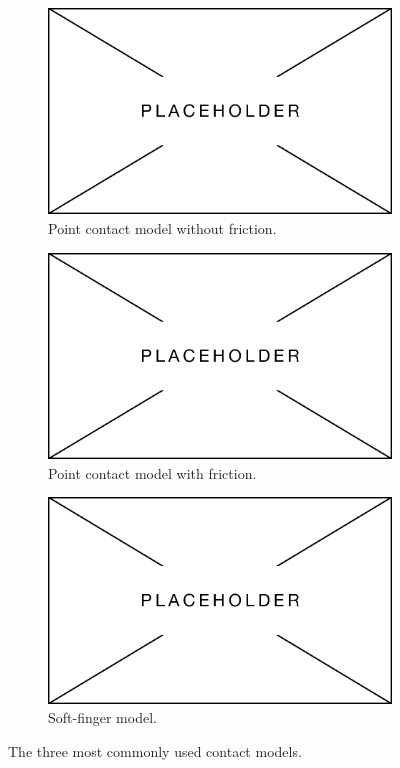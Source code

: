 \begin{figure}[h]
	\centering
	\begin{subfigure}[b]{0.3\textwidth}
		\centering
		\includegraphics[width=\textwidth]{img/placeholder.png}
		\caption{Point contact model without friction.}
		\label{fig:pwof}
	\end{subfigure}
	\hfill
	\begin{subfigure}[b]{0.3\textwidth}
		\centering
		\includegraphics[width=\textwidth]{img/placeholder.png}
		\caption{Point contact model with friction.}
		\label{fig:hf}
	\end{subfigure}
	\hfill
	\begin{subfigure}[b]{0.3\textwidth}
		\centering
		\includegraphics[width=\textwidth]{img/placeholder.png}
		\caption{Soft-finger model.}
		\label{fig:sf}
	\end{subfigure}
	   \caption{The three most commonly used contact models.}
	   \label{fig:contact-models}
\end{figure}

